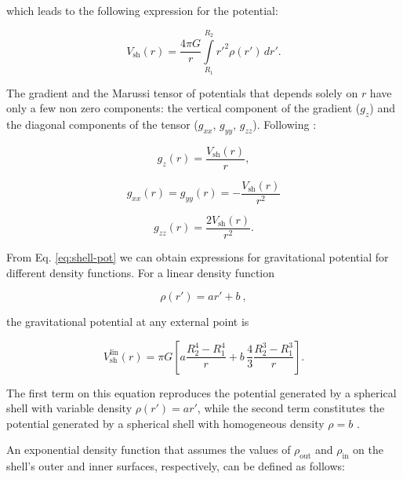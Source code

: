 \documentclass[extra]{gji}
\begin{document}
\noindent which leads to the following expression for the potential:

\begin{equation}
    V_\text{sh}(r) = \frac{4\pi G}{r}
    \int\limits_{R_1}^{R_2} {r'}^2 \rho(r') \, dr'.
\label{eq:shell-pot}
\end{equation}

The gradient and the Marussi tensor of potentials that
depends solely on $r$ have only a few non zero components: the vertical
component of the gradient ($g_z$) and the diagonal components of the
tensor ($g_{xx}$, $g_{yy}$, $g_{zz}$).
Following \citet{Grombein2013}:

\begin{equation}
    g_z(r) = \frac{V_\text{sh}(r)}{r},
\end{equation}

\begin{equation}
    g_{xx}(r) = g_{yy}(r) = -\frac{V_\text{sh}(r)}{r^2}
\end{equation}

\begin{equation}
    g_{zz}(r) = \frac{2V_\text{sh}(r)}{r^2}.
\end{equation}

From Eq. \ref{eq:shell-pot} we can obtain expressions for gravitational potential for
different density functions.
For a linear density function

\begin{equation}
    \rho(r') = ar' + b\ ,
\end{equation}

\noindent
the gravitational potential at any external point is

\begin{equation}
    V_\text{sh}^\text{lin}(r) = \pi G \left[
    a \frac{R_2^4 - R_1^4}{r} +
    b \,\frac{4}{3} \frac{R_2^3 - R_1^3}{r} \right].
    \label{eq:shell-pot-linear}
\end{equation}

\noindent The first term on this equation reproduces the potential generated
by a spherical shell with variable density $\rho(r') = ar'$, while the second
term constitutes the potential generated by a spherical shell with homogeneous
density $\rho = b$ \citep{Mikuska2006,Grombein2013}.

An exponential density function that assumes the values of $\rho_\text{out}$ and
$\rho_\text{in}$ on the shell's outer and inner surfaces, respectively, can be defined
as follows:
\end{document}
